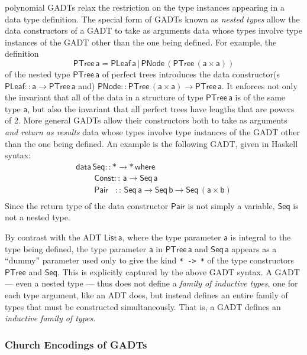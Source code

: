 \documentclass[acmsmall,screen,review,anonymous]{acmart}
\theoremstyle{definition}
\begin{document}
{\color{blue} polynomial} GADTs relax the restriction on the type
instances appearing in a data type definition. The special form of
GADTs known as {\em nested types} allow the data constructors of a
GADT to take as arguments data whose types involve type instances of
the GADT other than the one being defined. For example, the 
definition 
\[\mathsf{PTree \, a = PLeaf \,a \,|\, PNode \,(PTree\,(a \times
  a))}\] of the nested type $\mathsf{PTree\,a}$ of perfect trees
introduces the data constructor(s $\mathsf{PLeaf :: a \to PTree\,a}$
and) $\mathsf{PNode :: PTree \,(a\times a) \to PTree\,a}$. It enforces
not only the invariant that all of the data in a structure of type
$\mathsf{PTree\,a}$ is of the same type $\mathsf{a}$, but also the
invariant that all perfect trees have lengths that are powers of
2. More general GADTs allow their constructors both to take as
arguments {\em and return as results} data whose types involve type
instances of the GADT other than the one being defined. An example is
the following GADT, given in Haskell syntax:
\[\begin{array}{l}
\mathsf{data\, Seq :: * \to *\,where}\\
\mathsf{\;\;\;\;\;\;\;\;Const ::\, a \to Seq\,a}\\
\mathsf{\;\;\;\;\;\;\;\;Pair\,\,\,\,\, ::\, Seq \,a \to Seq\,b \to
  Seq\,(a \times b)}\\ 
\end{array}\]
Since the return type of the data constructor $\mathsf{Pair}$ is not
simply a variable, $\mathsf{Seq}$ is not a nested type.

By contrast with the ADT $\mathsf{List\, a}$, where the type parameter
$\mathsf{a}$ is integral to the type being defined, the type parameter
$\mathsf{a}$ in $\mathsf{PTree\,a}$ and $\mathsf{Seq\,a}$ appears as a
``dummy'' parameter used only to give the kind \verb|* -> *| of the
type constructors $\mathsf{PTree}$ and $\mathsf{Seq}$. This is
explicitly captured by the above GADT syntax. A GADT --- even a nested
type --- thus does not define a {\em family of inductive types}, one
for each type argument, like an ADT does, but instead defines an
entire family of types that must be constructed simultaneously. That
is, a GADT defines an {\em inductive family of types}.

\subsubsection{Church Encodings of GADTs}\label{sec:CEs}
\end{document}
